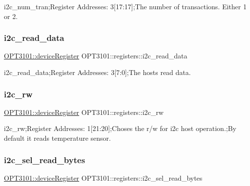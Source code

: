 i2c\+\_\+num\+\_\+tran;Register Addresses\+: 3\mbox{[}17\+:17\mbox{]};The number of transactions. Either 1 or 2. 

\mbox{\label{class_o_p_t3101_1_1registers_af7380f75d50a537df750a8039b4ecb53}} 
\subsubsection{\texorpdfstring{i2c\+\_\+read\+\_\+data}{i2c\_read\_data}}
{\footnotesize\ttfamily \mbox{\hyperlink{class_o_p_t3101_1_1device_register}{O\+P\+T3101\+::device\+Register}} O\+P\+T3101\+::registers\+::i2c\+\_\+read\+\_\+data}



i2c\+\_\+read\+\_\+data;Register Addresses\+: 3\mbox{[}7\+:0\mbox{]};The hosts read data. 

\mbox{\label{class_o_p_t3101_1_1registers_aa7c611361794c31bdd274f9817401258}} 
\subsubsection{\texorpdfstring{i2c\+\_\+rw}{i2c\_rw}}
{\footnotesize\ttfamily \mbox{\hyperlink{class_o_p_t3101_1_1device_register}{O\+P\+T3101\+::device\+Register}} O\+P\+T3101\+::registers\+::i2c\+\_\+rw}



i2c\+\_\+rw;Register Addresses\+: 1\mbox{[}21\+:20\mbox{]};Choses the r/w for i2c host operation.;By default it reads temperature sensor. 

\mbox{\label{class_o_p_t3101_1_1registers_ae3cafcbc6dbd88c078e92f49b54d9407}} 
\subsubsection{\texorpdfstring{i2c\+\_\+sel\+\_\+read\+\_\+bytes}{i2c\_sel\_read\_bytes}}
{\footnotesize\ttfamily \mbox{\hyperlink{class_o_p_t3101_1_1device_register}{O\+P\+T3101\+::device\+Register}} O\+P\+T3101\+::registers\+::i2c\+\_\+sel\+\_\+read\+\_\+bytes}



